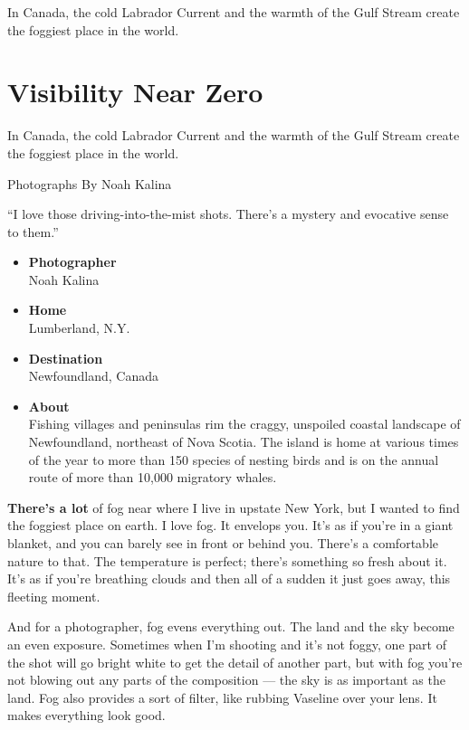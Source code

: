 In Canada, the cold Labrador Current and the warmth of the Gulf Stream
create the foggiest place in the world.

\hypertarget{visibility-near-zero-1}{%
\section{Visibility Near Zero}\label{visibility-near-zero-1}}

In Canada, the cold Labrador Current and the warmth of the Gulf Stream
create the foggiest place in the world.

Photographs By Noah Kalina

``I love those driving-into-the-mist shots. There's a mystery and
evocative sense to them.''

\begin{itemize}
\tightlist
\item
  \textbf{Photographer}\\
  Noah Kalina
\item
  \textbf{Home}\\
  Lumberland, N.Y.
\item
  \textbf{Destination}\\
  Newfoundland, Canada
\item
  \textbf{About}\\
  Fishing villages and peninsulas rim the craggy, unspoiled coastal
  landscape of Newfoundland, northeast of Nova Scotia. The island is
  home at various times of the year to more than 150 species of nesting
  birds and is on the annual route of more than 10,000 migratory whales.
\end{itemize}

\textbf{There's a lot} of fog near where I live in upstate New York, but
I wanted to find the foggiest place on earth. I love fog. It envelops
you. It's as if you're in a giant blanket, and you can barely see in
front or behind you. There's a comfortable nature to that. The
temperature is perfect; there's something so fresh about it. It's as if
you're breathing clouds and then all of a sudden it just goes away, this
fleeting moment.

And for a photographer, fog evens everything out. The land and the sky
become an even exposure. Sometimes when I'm shooting and it's not foggy,
one part of the shot will go bright white to get the detail of another
part, but with fog you're not blowing out any parts of the composition
--- the sky is as important as the land. Fog also provides a sort of
filter, like rubbing Vaseline over your lens. It makes everything look
good.

